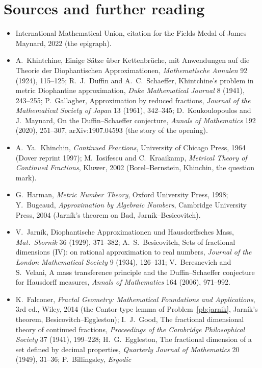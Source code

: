 \section*{Sources and further reading}

\begin{itemize}
\item International Mathematical Union, citation for the Fields Medal of James Maynard, 2022 (the epigraph).
\item A.~Khintchine, Einige Sätze über Kettenbrüche, mit Anwendungen auf die Theorie der Diophantischen Approximationen, \emph{Mathematische Annalen} 92 (1924), 115--125;
R.~J.~Duffin and A.~C.~Schaeffer, Khintchine's problem in metric Diophantine approximation, \emph{Duke Mathematical Journal} 8 (1941), 243--255; P.~Gallagher,
Approximation by reduced fractions, \emph{Journal of the Mathematical Society of Japan} 13 (1961), 342--345; D.~Koukoulopoulos and J.~Maynard, On the Duffin--Schaeffer
conjecture, \emph{Annals of Mathematics} 192 (2020), 251--307, arXiv:1907.04593 (the story of the opening).
\item A.~Ya.~Khinchin, \emph{Continued Fractions}, University of Chicago Press, 1964 (Dover reprint 1997); M.~Iosifescu and C.~Kraaikamp, \emph{Metrical Theory of
Continued Fractions}, Kluwer, 2002 (Borel--Bernstein, Khinchin, the question mark).
\item G.~Harman, \emph{Metric Number Theory}, Oxford University Press, 1998; Y.~Bugeaud, \emph{Approximation by Algebraic Numbers}, Cambridge University Press, 2004
(Jarník's theorem on $\mathrm{Bad}$, Jarník--Besicovitch).
\item V.~Jarník, Diophantische Approximationen und Hausdorffsches Mass, \emph{Mat.\ Sbornik} 36 (1929), 371--382; A.~S.~Besicovitch, Sets of fractional dimensions
(IV): on rational approximation to real numbers, \emph{Journal of the London Mathematical Society} 9 (1934), 126--131; V.~Beresnevich and S.~Velani, A mass transference
principle and the Duffin--Schaeffer conjecture for Hausdorff measures, \emph{Annals of Mathematics} 164 (2006), 971--992.
\item K.~Falconer, \emph{Fractal Geometry: Mathematical Foundations and Applications}, 3rd ed., Wiley, 2014 (the Cantor-type lemma of Problem~\ref{pb:jarnik}, Jarník's theorem,
Besicovitch--Eggleston); I.~J.~Good, The fractional dimensional theory of continued fractions, \emph{Proceedings of the Cambridge Philosophical Society} 37 (1941), 199--228;
H.~G.~Eggleston, The fractional dimension of a set defined by decimal properties, \emph{Quarterly Journal of Mathematics} 20 (1949), 31--36; P.~Billingsley, \emph{Ergodic
}
\end{itemize}
